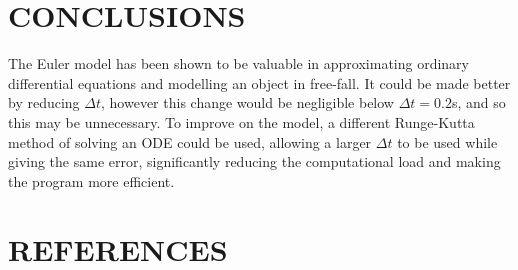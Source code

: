 \documentclass[twocolumn,prl,nobalancelastpage,aps,10pt]{revtex4-1}
\begin{document}
\section{CONCLUSIONS}

The Euler model has been shown to be valuable in approximating ordinary differential equations and modelling an object in free-fall. It could be made better by reducing $\Delta t$, however this change would be negligible below $\Delta t = 0.2$s, and so this may be unnecessary. To improve on the model, a different Runge-Kutta method of solving an ODE could be used, allowing a larger $\Delta t$ to be used while giving the same error, significantly reducing the computational load and making the program more efficient.

\section{REFERENCES}



\end{document}
